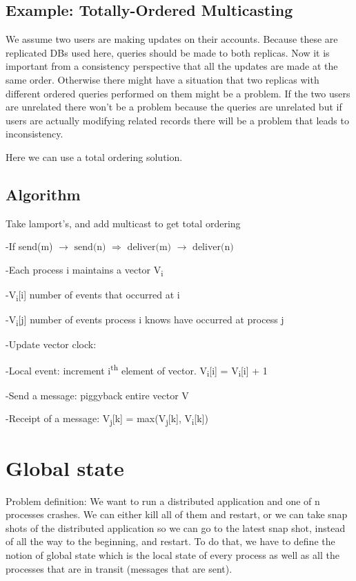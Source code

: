 \documentclass[twoside]{article}
\begin{document}
\subsection{Example: Totally-Ordered Multicasting}

We assume two users are making updates on their accounts. Because these are replicated DBs used here, queries should be made to both replicas. Now it is important from a consistency perspective that all the updates are made at the same order. Otherwise there might have a situation that two replicas with different ordered queries performed on them might be a problem. If the two users are unrelated there won't be a problem because the queries are unrelated but if users are actually modifying related records there will be a problem that leads to inconsistency. 

Here we can use a total ordering solution.


\subsection{Algorithm}
Take lamport's, and add multicast to get total ordering

-If send(m) $\rightarrow\text{ send(n) }\Rightarrow\text{ deliver(m) }\rightarrow\text{ deliver(n)}$

-Each process i maintains a vector V\textsubscript{i}

-V\textsubscript{i}[i] number of events that occurred at i

-V\textsubscript{i}[j] number of events process i knows have occurred at process j

-Update vector clock:

-Local event: increment i\textsuperscript{th} element of vector. V\textsubscript{i}[i] = V\textsubscript{i}[i] + 1

-Send a message: piggyback entire vector V

-Receipt of a message: V\textsubscript{j}[k] = max(V\textsubscript{j}[k], V\textsubscript{i}[k])
\section{Global state}
Problem definition: We want to run a distributed application and one of n processes crashes. We can either kill all of them and restart, or we can take snap shots of the distributed application so we can go to the latest snap shot, instead of all the way to the beginning, and restart. To do that, we have to define the notion of global state which is the local state of every process as well as all the processes that are in transit (messages that are sent). 
\end{document}
